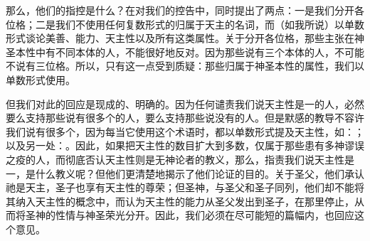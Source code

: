 那么，他们的指控是什么？在对我们的控告中，同时提出了两点：一是我们分开各位格；二是我们不使用任何复数形式的归属于天主的名词，而（如我所说）以单数形式谈论美善、能力、天主性以及所有这类属性。关于分开各位格，那些主张在神圣本性中有不同本体的人，不能很好地反对。因为那些说有三个本体的人，不可能不说有三位格。所以，只有这一点受到质疑：那些归属于神圣本性的属性，我们以单数形式使用。\par

但我们对此的回应是现成的、明确的。因为任何谴责我们说天主性是一的人，必然要么支持那些说有很多个的人，要么支持那些说没有的人。但是默感的教导不容许我们说有很多个，因为每当它使用这个术语时，都以单数形式提及天主性，如：；以及另一处：。因此，如果把天主性的数目扩大到多数，仅属于那些患有多神谬误之疫的人，而彻底否认天主性则是无神论者的教义，那么，指责我们说天主性是一，是什么教义呢？但他们更清楚地揭示了他们论证的目的。关于圣父，他们承认祂是天主，圣子也享有天主性的尊荣；但圣神，与圣父和圣子同列，他们却不能将其纳入天主性的概念中，而认为天主性的能力从圣父发出到圣子，在那里停止，从而将圣神的性情与神圣荣光分开。因此，我们必须在尽可能短的篇幅内，也回应这个意见。\par

